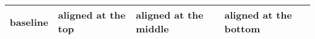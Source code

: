 \documentclass{article}
\begin{document}
\begin{tabular}{@{}lp{1.2cm}m{1.2cm}b{1.2cm}@{}}
  \hline
  baseline & aligned at the top& aligned at the middle & aligned at the bottom\\
  \hline
\end{tabular}
\end{document}
